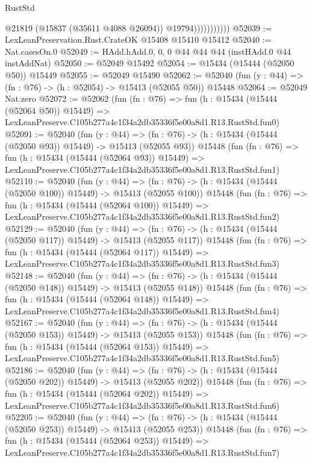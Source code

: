 \begin{lexlean}{RustStd}
\begin{coremodule}
                          @21819
                          (@15837 (@35611 @4088 @26094))
                          @19794)))))))))))
@52039 := LexLeanPreservation.Rust.CrateOK @15408 @15410 @15412
@52040 := Nat.casesOn.{0}
@52049 := HAdd.hAdd.{0, 0, 0} @44 @44 @44 (instHAdd.{0} @44 instAddNat)
@52050 := @52049 @15492
@52054 := @15434 (@15444 (@52050 @50)) @15449
@52055 := @52049 @15490
@52062 := @52040 (fun (y : @44) => (fn : @76) -> (h : @52054) -> @15413 (@52055 @50)) @15448
@52064 := @52049 Nat.zero
@52072 := @52062
    (fun (fn : @76) =>
    fun (h : @15434 (@15444 (@52064 @50)) @15449) =>
    LexLeanPreserve.C105b277a4c1f34a2db35336f5e00a8d1.R13.RustStd.fun0)
@52091 := @52040
    (fun (y : @44) =>
    (fn : @76) -> (h : @15434 (@15444 (@52050 @93)) @15449) -> @15413 (@52055 @93))
    @15448
    (fun (fn : @76) =>
    fun (h : @15434 (@15444 (@52064 @93)) @15449) =>
    LexLeanPreserve.C105b277a4c1f34a2db35336f5e00a8d1.R13.RustStd.fun1)
@52110 := @52040
    (fun (y : @44) =>
    (fn : @76) -> (h : @15434 (@15444 (@52050 @100)) @15449) -> @15413 (@52055 @100))
    @15448
    (fun (fn : @76) =>
    fun (h : @15434 (@15444 (@52064 @100)) @15449) =>
    LexLeanPreserve.C105b277a4c1f34a2db35336f5e00a8d1.R13.RustStd.fun2)
@52129 := @52040
    (fun (y : @44) =>
    (fn : @76) -> (h : @15434 (@15444 (@52050 @117)) @15449) -> @15413 (@52055 @117))
    @15448
    (fun (fn : @76) =>
    fun (h : @15434 (@15444 (@52064 @117)) @15449) =>
    LexLeanPreserve.C105b277a4c1f34a2db35336f5e00a8d1.R13.RustStd.fun3)
@52148 := @52040
    (fun (y : @44) =>
    (fn : @76) -> (h : @15434 (@15444 (@52050 @148)) @15449) -> @15413 (@52055 @148))
    @15448
    (fun (fn : @76) =>
    fun (h : @15434 (@15444 (@52064 @148)) @15449) =>
    LexLeanPreserve.C105b277a4c1f34a2db35336f5e00a8d1.R13.RustStd.fun4)
@52167 := @52040
    (fun (y : @44) =>
    (fn : @76) -> (h : @15434 (@15444 (@52050 @153)) @15449) -> @15413 (@52055 @153))
    @15448
    (fun (fn : @76) =>
    fun (h : @15434 (@15444 (@52064 @153)) @15449) =>
    LexLeanPreserve.C105b277a4c1f34a2db35336f5e00a8d1.R13.RustStd.fun5)
@52186 := @52040
    (fun (y : @44) =>
    (fn : @76) -> (h : @15434 (@15444 (@52050 @202)) @15449) -> @15413 (@52055 @202))
    @15448
    (fun (fn : @76) =>
    fun (h : @15434 (@15444 (@52064 @202)) @15449) =>
    LexLeanPreserve.C105b277a4c1f34a2db35336f5e00a8d1.R13.RustStd.fun6)
@52205 := @52040
    (fun (y : @44) =>
    (fn : @76) -> (h : @15434 (@15444 (@52050 @253)) @15449) -> @15413 (@52055 @253))
    @15448
    (fun (fn : @76) =>
    fun (h : @15434 (@15444 (@52064 @253)) @15449) =>
    LexLeanPreserve.C105b277a4c1f34a2db35336f5e00a8d1.R13.RustStd.fun7)

\end{coremodule}
\end{lexlean}
